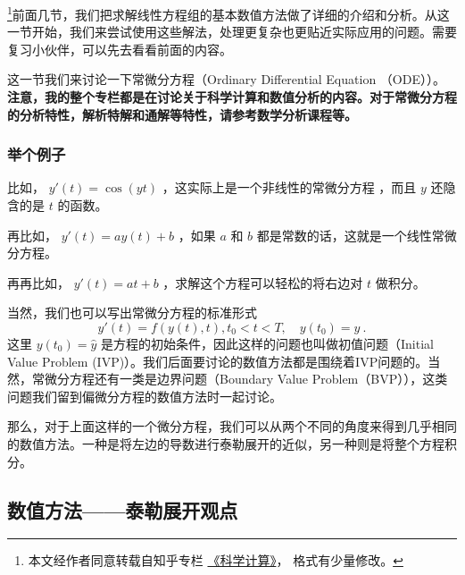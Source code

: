
\footnote{本文经作者同意转载自知乎专栏 \href{https://www.zhihu.com/column/c_1226443594048942080}{《科学计算》}， 格式有少量修改。}前面几节，我们把求解线性方程组的基本数值方法做了详细的介绍和分析。从这一节开始，我们来尝试使用这些解法，处理更复杂也更贴近实际应用的问题。需要复习小伙伴，可以先去看看前面的内容。

这一节我们来讨论一下常微分方程（Ordinary Differential Equation （ODE））。\textbf{注意，我的整个专栏都是在讨论关于科学计算和数值分析的内容。对于常微分方程的分析特性，解析特解和通解等特性，请参考数学分析课程等。}

\subsubsection{举个例子}

比如， $y'(t)=\cos(yt)$ ，这实际上是一个非线性的常微分方程 ，而且 $y$ 还隐含的是 $t$ 的函数。

再比如， $y'(t)=ay(t)+b$ ，如果 $a$ 和 $b$ 都是常数的话，这就是一个线性常微分方程。

再再比如， $y'(t)=at+b$ ，求解这个方程可以轻松的将右边对 $t$ 做积分。

当然，我们也可以写出常微分方程的标准形式
\begin{equation}
y'(t)=f(y(t),t),t _0 < t < T,\quad y(t_0)=\hat{y}~.
\end{equation}
这里 $y(t_0)=\hat{y}$ 是方程的初始条件，因此这样的问题也叫做初值问题（Initial Value Problem (IVP)）。我们后面要讨论的数值方法都是围绕着IVP问题的。当然，常微分方程还有一类是边界问题（Boundary Value Problem（BVP）），这类问题我们留到偏微分方程的数值方法时一起讨论。

那么，对于上面这样的一个微分方程，我们可以从两个不同的角度来得到几乎相同的数值方法。一种是将左边的导数进行泰勒展开的近似，另一种则是将整个方程积分。

\subsection{数值方法——泰勒展开观点}

